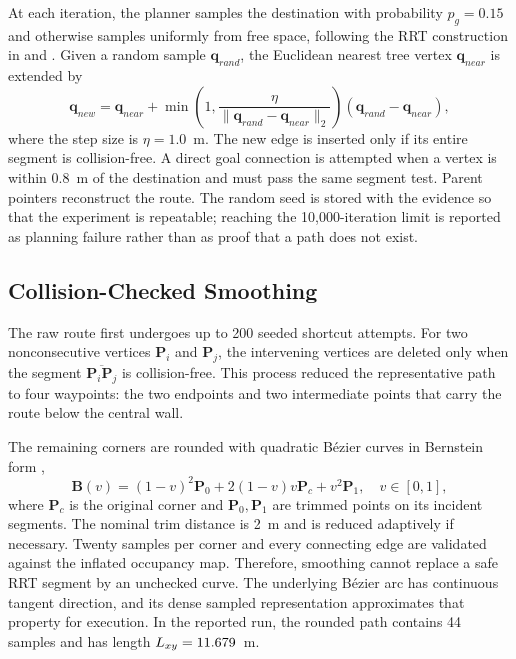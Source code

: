 \documentclass[conference]{IEEEtran}
\begin{document}
At each iteration, the planner samples the destination with probability
$p_g=0.15$ and otherwise samples uniformly from free space, following the RRT
construction in \cite{lavalle1998} and \cite[Sec.~5.5]{lavalle2006}. Given a random
sample $\mathbf{q}_{rand}$, the Euclidean nearest tree vertex
$\mathbf{q}_{near}$ is extended by
\begin{equation}
 \mathbf{q}_{new}=\mathbf{q}_{near}+
 \min\!\left(1,\frac{\eta}{\lVert\mathbf{q}_{rand}-\mathbf{q}_{near}\rVert_2}\right)
 (\mathbf{q}_{rand}-\mathbf{q}_{near}),
 \label{eq:steer}
\end{equation}
where the step size is $\eta=1.0$~m. The new edge is inserted only if its entire
segment is collision-free. A direct goal connection is attempted when a vertex
is within 0.8~m of the destination and must pass the same segment test. Parent
pointers reconstruct the route. The random seed is stored with the evidence so
that the experiment is repeatable; reaching the 10,000-iteration limit is
reported as planning failure rather than as proof that a path does not exist.

\subsection{Collision-Checked Smoothing}

The raw route first undergoes up to 200 seeded shortcut attempts. For two
nonconsecutive vertices $\mathbf{P}_i$ and $\mathbf{P}_j$, the intervening
vertices are deleted only when the segment $\overline{\mathbf{P}_i\mathbf{P}_j}$
is collision-free. This process reduced the representative path to four
waypoints: the two endpoints and two intermediate points that carry the route
below the central wall.

The remaining corners are rounded with quadratic B\'ezier curves in Bernstein
form \cite[Chs.~4--5]{farin2002},
\begin{equation}
 \mathbf{B}(v)=(1-v)^2\mathbf{P}_0+2(1-v)v\mathbf{P}_c+v^2\mathbf{P}_1,
 \quad v\in[0,1],
 \label{eq:bezier}
\end{equation}
where $\mathbf{P}_c$ is the original corner and $\mathbf{P}_0,\mathbf{P}_1$
are trimmed points on its incident segments. The nominal trim distance is 2~m
and is reduced adaptively if necessary. Twenty samples per corner and every
connecting edge are validated against the inflated occupancy map. Therefore,
smoothing cannot replace a safe RRT segment by an unchecked curve. The
underlying B\'ezier arc has continuous tangent direction, and its dense sampled
representation approximates that property for execution. In the reported run,
the rounded path contains 44 samples and has length
$L_{xy}=11.679$~m.
\end{document}
